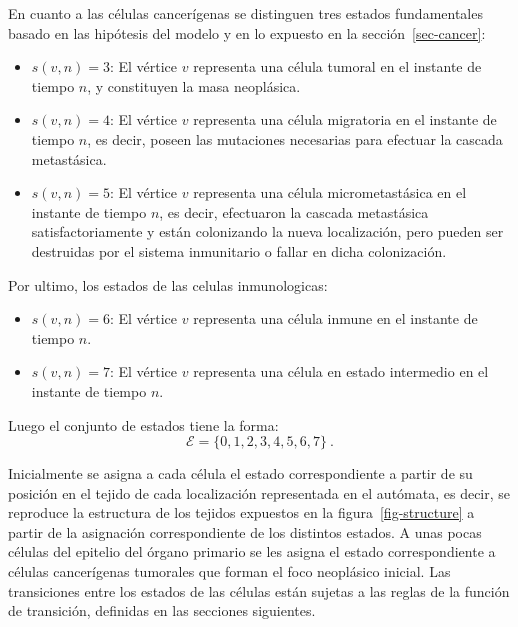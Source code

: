 En cuanto a las c\'elulas cancer\'igenas se distinguen tres estados fundamentales basado en las hip\'otesis del modelo y en lo expuesto en la secci\'on~\ref{sec-cancer}:

\begin{itemize}
\item $s(v,n)=3$: El v\'ertice $v$ representa una c\'elula tumoral en el instante de tiempo $n$, y constituyen la masa neopl\'asica.

\item $s(v,n)=4$: El v\'ertice $v$ representa una c\'elula migratoria en el instante de tiempo $n$, es decir, poseen las mutaciones necesarias para efectuar la cascada metast\'asica.

\item $s(v,n)=5$: El v\'ertice $v$ representa una c\'elula micrometast\'asica en el instante de tiempo $n$, es decir, efectuaron la cascada metast\'a\-sica satisfactoriamente y est\'an colonizando la nueva localizaci\'on, pero pueden ser destruidas por el sistema inmunitario o fallar en dicha colonizaci\'on. 
\end{itemize}

Por ultimo, los estados de las celulas inmunologicas:
\begin{itemize}
    \item $s(v, n) = 6$: El v\'ertice $v$ representa una c\'elula inmune en el instante de tiempo $n$.
    \item $s(v, n) = 7$: El v\'ertice $v$ representa una c\'elula en estado intermedio en el instante de tiempo $n$.
\end{itemize}

Luego el conjunto de estados tiene la forma:
\begin{equation}
\boxed{\mathcal{E} = \lbrace 0, 1, 2, 3, 4, 5, 6, 7 \rbrace}~. \label{eq-states}
\end{equation}

Inicialmente se asigna a cada c\'elula el estado correspondiente a partir de su posici\'on en el tejido de cada localizaci\'on representada en el aut\'omata, es decir, se reproduce la estructura de los tejidos expuestos en la figura~\ref{fig-structure} a partir de la asignaci\'on correspondiente de los distintos estados. A unas pocas c\'elulas del epitelio del \'organo primario se les asigna el estado correspondiente a c\'elulas cancer\'igenas tumorales que forman el foco neopl\'asico inicial. Las transiciones entre los estados de las c\'elulas est\'an sujetas a las reglas de la funci\'on de transici\'on, definidas en las secciones siguientes.

